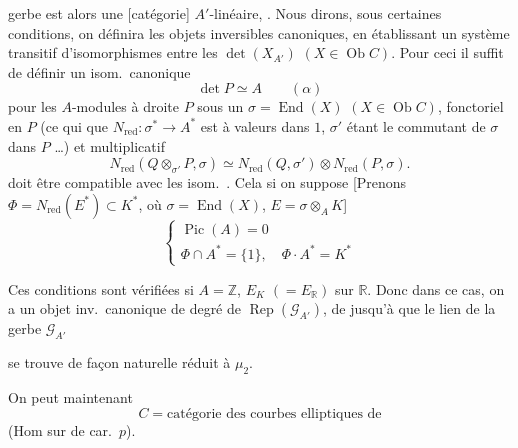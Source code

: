 \documentclass[11pt,a4paper]{article}
\begin{document}

gerbe est alors une [catégorie] $A'$-linéaire, \ill{}. 
Nous dirons,
sous certaines conditions, on définira les objets inversibles
canoniques, en établissant un système transitif d'isomorphismes entre les
$\det(X_{A'})$ $(X \in \operatorname{Ob} C)$. Pour ceci il suffit de définir
un isom.\ canonique
\[
  \det P \simeq A \qquad (\alpha)
\]
pour les $A$-modules \ill{} à droite $P$ sous un $\sigma =
\operatorname{End}(X)$ $(X \in \operatorname{Ob} C)$, fonctoriel en $P$ (ce
qui  que $N_{\mathrm{red}} : \sigma^{*} \to A^{*}$ est à
valeurs dans $1$, \ill{} $\sigma'$ étant le commutant de $\sigma$ dans $P$
…) et multiplicatif \ill{}
\[
  N_{\mathrm{red}}(Q \otimes_{\sigma'} P, \sigma) \simeq
  N_{\mathrm{red}}(Q, \sigma') \otimes N_{\mathrm{red}}(P, \sigma).
\]
\ill{} doit être compatible avec les isom.\ \ill{}. Cela 
si on suppose [Prenons $\Phi = N_{\mathrm{red}}(E^{*}) \subset K^{*}$, où
$\sigma = \operatorname{End}(X)$, $E = \sigma \otimes_{A} K$]
\[
  \begin{cases}
    \operatorname{Pic}(A) = 0 \\
    \Phi \cap A^{*} = \{1\}, \quad \Phi \cdot A^{*} = K^{*}
  \end{cases}
\]

Ces conditions sont vérifiées 
si $A = \mathbb{Z}$, $E_{K}$ $(= E_{\mathbb{R}})$ \ill{}
\struck{\ill{} \ill{} \ill{}} sur $\mathbb{R}$. Donc dans ce cas, on a un
objet inv.\ canonique de degré \ill{} de $\operatorname{Rep}(\mathcal{G}_{A'})$,
de \ill{} jusqu'à que le lien  de la gerbe
$\mathcal{G}_{A'}$

se trouve de façon naturelle réduit à $\mu_{2}$.

On peut maintenant \ill{}
\[
  C = \text{catégorie des courbes elliptiques de}
\]
\ill{} (Hom \ill{} sur  de car.~$p$).
\end{document}
